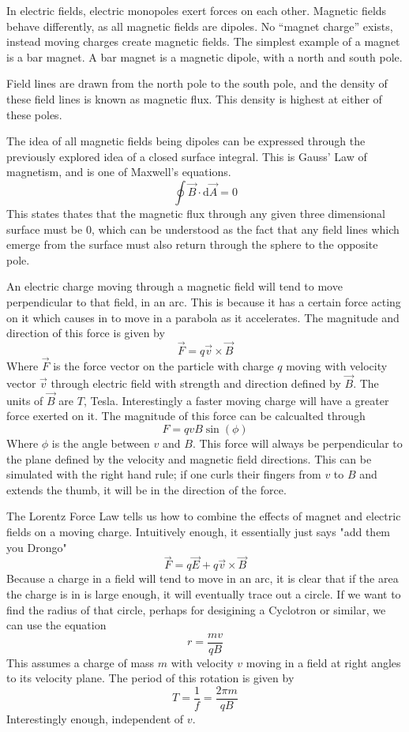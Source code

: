\documentclass[12pt]{report}
\begin{document}
\begin{flushleft}
In electric fields, electric monopoles exert forces on each other. Magnetic
fields behave differently, as all magnetic fields are dipoles. No ``magnet
charge'' exists, instead moving charges create magnetic fields. The simplest
example of a magnet is a bar magnet. A bar magnet is a magnetic dipole, with a 
north and south pole. \par
Field lines are drawn from the north pole to the south pole, and the density of
these field lines is known as magnetic flux. This density is highest at either
of these poles. \par
The idea of all magnetic fields being dipoles can be expressed through the
previously explored idea of a closed surface integral. This is Gauss' Law of
magnetism, and is one of Maxwell's equations.
\[\oint \vec{B}\cdot\mathrm{d}\vec{A} = 0\]
This states thates that the magnetic flux through any given three dimensional
surface must be \(0\), which can be understood as the fact that any field lines
which emerge from the surface must also return through the sphere to the 
opposite pole. \par
An electric charge moving through a magnetic field will tend to move
perpendicular to that field, in an arc. This is because it has a certain force
acting on it which causes in to move in a parabola as it accelerates. The
magnitude and direction of this force is given by
\[\vec{F} = q\vec{v}\times\vec{B}\]
Where \(\vec{F}\) is the force vector on the particle with charge \(q\) moving
with velocity vector \(\vec{v}\) through electric field with strength and
direction defined by \(\vec{B}\). The units of \(\vec{B}\) are \(T\), Tesla.
Interestingly a faster moving charge will have a greater force exerted on it.
The magnitude of this force can be calcualted through
\[F = qvB\sin(\phi)\]
Where \(\phi\) is the angle between \(v\) and \(B\). This force will always be
perpendicular to the plane defined by the velocity and magnetic field
directions. This can be simulated with the right hand rule; if one curls their
fingers from \(v\) to \(B\) and extends the thumb, it will be in the direction
of the force. \par
The Lorentz Force Law tells us how to combine the effects of magnet and
electric fields on a moving charge. Intuitively enough, it essentially just
says "add them you Drongo"
\[\vec{F} = q\vec{E} + q\vec{v}\times\vec{B}\]
Because a charge in a field will tend to move in an arc, it is clear that if
the area the charge is in is large enough, it will eventually trace out a
circle. If we want to find the radius of that circle, perhaps for desigining
a Cyclotron or similar, we can use the equation
\[r = \frac{mv}{qB}\]
This assumes a charge of mass \(m\) with velocity \(v\) moving in a field
at right angles to its velocity plane. The period of this rotation is given
by
\[T = \frac{1}{f} = \frac{2\pi m}{qB}\]
Interestingly enough, independent of \(v\).


\end{flushleft}
\end{document}
